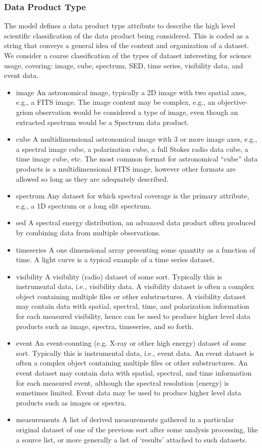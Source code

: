 \documentclass[11pt,a4paper]{ivoa}
\begin{document}
\subsubsection{Data Product Type}
\label{bkm:Ref286875933}The model defines a data product type attribute to describe the high level scientific
classification of the data product being considered.  This is coded as a string that conveys a general idea of the
content and organization of a dataset.  We consider a coarse classification of the types of dataset interesting for
science usage, covering: image, cube, spectrum, SED, time series, visibility data, and event data.

\begin{itemize}
\item image An astronomical image, typically a 2D image with two spatial axes, e.g., a FITS image.  The image content
may be complex, e.g., an objective-grism observation would be considered a type of image, even though an extracted
spectrum would be a Spectrum data product.
\item cube  A multidimensional astronomical image with 3 or more image axes, e.g., a spectral image cube, a polarization
cube, a full Stokes radio data cube, a time image cube, etc.  The most common format for astronomical ``cube'' data
products is a multidimensional FITS image, however other formats are allowed so long as they are adequately described.
\item spectrum Any dataset for which spectral coverage is the primary attribute, e.g., a 1D spectrum or a long slit
spectrum.
\item sed  A spectral energy distribution, an advanced data product often produced by combining data from multiple
observations.
\item timeseries A one dimensional array presenting some quantity as a function of time.  A light curve is a typical
example of a time series dataset.
\item visibility A visibility (radio) dataset of some sort.  Typically this is instrumental data, i.e.,
{\textquotedbl}visibility data{\textquotedbl}.  A visibility dataset is often a complex object containing multiple
files or other substructures.  A visibility dataset may contain data with spatial, spectral, time, and polarization
information for each measured visibility, hence can be used to produce higher level data products such as image,
spectra, timeseries, and so forth.
\item event An event-counting (e.g. X-ray or other high energy) dataset of some sort.  Typically this is instrumental
data, i.e., {\textquotedbl}event data{\textquotedbl}.  An event dataset is often a complex object containing multiple
files or other substructures.  An event dataset may contain data with spatial, spectral, and time information for each
measured event, although the spectral resolution (energy) is sometimes limited.  Event data may be used to produce
higher level data products such as images or spectra.
\item measurements A list of derived measurements gathered in a particular original dataset of one of the previous sort
after some analysis processing, like a source list, or more generally a list of `results' attached to such datasets.
\end{itemize}
\end{document}
